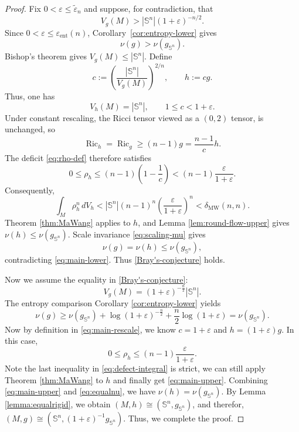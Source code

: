 \documentclass[11pt, reqno]{amsart}
\numberwithin{equation}{section}
\theoremstyle{remark}
\DeclareMathOperator{\Ric}{Ric}
\newcommand{\Sph}{\mathbb S}
\newcommand{\eps}{\varepsilon}
\newcommand{\MW}{\mathrm{MW}}
\newcommand{\ent}{\mathrm{ent}}
\begin{document}
\begin{proof}
Fix $0<\eps\leq\tilde \eps_n$ and suppose, for contradiction, that
\begin{equation}\label{eq:contradiction-volume}
V_g(M)>|\Sph^n|(1+\eps)^{-n/2}.
\end{equation}
Since $0<\eps\leq\eps_{\ent}(n)$, Corollary~\ref{cor:entropy-lower} gives
\begin{equation}\label{eq:main-lower}
\nu(g)>\nu(g_{\Sph^n}).
\end{equation}
Bishop's theorem gives $V_g(M)\leq |\Sph^n|$. Define
\begin{equation}\label{eq:main-rescale}
c:=\left(\frac{|\Sph^n|}{V_g(M)}\right)^{2/n},
\qquad h:=cg.
\end{equation}
Thus, one has 
\begin{equation}\label{eq:c-range}
V_h(M)=|\Sph^n|,
\qquad 1\leq c<1+\eps.
\end{equation}
Under constant rescaling, the Ricci tensor viewed as a $(0,2)$ tensor, is unchanged, so
\begin{equation}\label{eq:rescaled-Ricci}
\Ric_h=\Ric_g\geq(n-1)g=\frac{n-1}{c}h.
\end{equation}
The deficit \eqref{eq:rho-def} therefore satisfies
\begin{equation}\label{eq:defect-pointwise}
0\leq\rho_h\leq(n-1)\left(1-\frac1c\right)
<(n-1)\frac{\eps}{1+\eps}.
\end{equation}
Consequently,
\begin{equation}\label{eq:defect-integral}
\int_M\rho_h^n\,dV_h
<|\Sph^n|(n-1)^n\left(\frac{\eps}{1+\eps}\right)^n<\delta_{\MW}(n,n).
\end{equation}
Theorem \ref{thm:MaWang} applies to $h$, and
Lemma \ref{lem:round-flow-upper} gives $\nu(h)\leq\nu(g_{\Sph^n})$. Scale
invariance \eqref{eq:scaling-mu} gives
\begin{equation}\label{eq:main-upper}
\nu(g)=\nu(h)\leq\nu(g_{\Sph^n}),
\end{equation}
contradicting \eqref{eq:main-lower}. Thus \eqref{Bray's-conjecture} holds.

{Now we assume the equality in \eqref{Bray's-conjecture}: 
\begin{equation*}
V_g(M)=(1+\eps)^{-\frac{n}{2}}|\Sph^n|.    
\end{equation*}
The entropy comparison Corollary \ref{cor:entropy-lower} yields
\begin{equation}\label{eq:equalnu}
\nu(g)\geq\nu(g_{\Sph^n})+\log(1+\eps)^{-\frac{n}{2}}
+\frac n2\log(1+\eps)=\nu(g_{\Sph^n}).
\end{equation}
Now by definition in \eqref{eq:main-rescale}, we know $c=1+\eps$ and $h=(1+\eps)g$. In this case,
$$0\leq \rho_h\leq (n-1)\frac{\eps}{1+\eps}.$$
Note the last inequality in \eqref{eq:defect-integral} is strict, we can still apply Theorem \ref{thm:MaWang} to $h$ and finally get \eqref{eq:main-upper}.
Combining \eqref{eq:main-upper} and \eqref{eq:equalnu}, we have $\nu(h)=\nu(g_{\Sph^n}).$ By Lemma \ref{lemma:equalrigid}, we obtain $(M, h)\cong(\Sph^n, g_{\Sph^n})$, and therefor, $(M, g)\cong(\Sph^n, (1+\eps)^{-1}g_{\Sph^n})$. Thus, we complete the proof.}

\end{proof}
\end{document}

